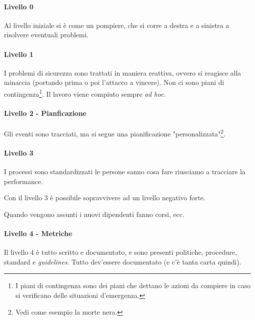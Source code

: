 \paragraph{Livello 0}


Al livello iniziale si è come un pompiere, che si corre a destra e a sinistra a 
risolvere eventuali problemi.

\paragraph{Livello 1}

I problemi di sicurezza sono trattati in maniera reattiva, ovvero si reagisce 
alla minaccia (portando prima o poi l'attacco a vincere). Non ci sono piani di 
contingenza\footnote{I piani di contingenza sono dei piani che dettano le azioni 
da compiere in caso si verificano delle situazioni d'emergenza.}. Il lavoro 
viene compiuto sempre \textit{ad hoc}.

\paragraph{Livello 2 - Pianficazione}

Gli eventi sono tracciati, ma si segue una pianificazione 
"personalizzata"\footnote{Vedi come esempio la morte nera.}.

\paragraph{Livello 3}
I processi sono standardizzati le persone sanno cosa fare riusciamo a tracciare 
la performance. 



Con il livello 3 è possibile sopravvivere ad un livello negativo forte.






Quando vengono assunti i nuovi dipendenti fanno corsi, ecc.








\paragraph{Livello 4 - Metriche}


Il livello 4 è tutto scritto e documentato, e sono presenti politiche, 
procedure, standard e \textit{guidelines}. Tutto dev'essere documentato (e c'è 
tanta carta quindi).

